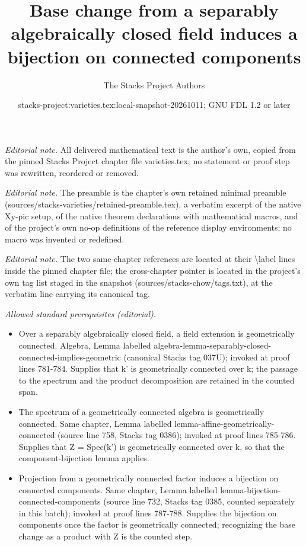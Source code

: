 \documentclass[10pt,a4paper]{amsart}
\title{Base change from a separably algebraically closed field induces a bijection on connected components}
\author{The Stacks Project Authors}
\date{stacks-project:varieties.tex:local-snapshot-20261011; GNU FDL 1.2 or later}
\theoremstyle{plain}
\theoremstyle{definition}
\theoremstyle{remark}
\numberwithin{equation}{subsection}
\begin{document}
\maketitle
\noindent\textit{Editorial note.} All delivered mathematical text is the author's own, copied from the pinned Stacks Project chapter file varieties.tex; no statement or proof step was rewritten, reordered or removed.\par\medskip
\noindent\textit{Editorial note.} The preamble is the chapter's own retained minimal preamble (sources/stacks-varieties/retained-preamble.tex), a verbatim excerpt of the native Xy-pic setup, of the native theorem declarations with mathematical macros, and of the project's own no-op definitions of the reference display environments; no macro was invented or redefined.\par\medskip
\noindent\textit{Editorial note.} The two same-chapter references are located at their \textbackslash{}label lines inside the pinned chapter file; the cross-chapter pointer is located in the project's own tag list staged in the snapshot (sources/stacks-chow/tags.txt), at the verbatim line carrying its canonical tag.\par\medskip
\noindent\textit{Allowed standard prerequisites (editorial).}\begin{itemize}
\item Over a separably algebraically closed field, a field extension is geometrically connected. Algebra, Lemma labelled algebra-lemma-separably-closed-connected-implies-geometric (canonical Stacks tag 037U); invoked at proof lines 781-784. Supplies that k' is geometrically connected over k; the passage to the spectrum and the product decomposition are retained in the counted span.
\item The spectrum of a geometrically connected algebra is geometrically connected. Same chapter, Lemma labelled lemma-affine-geometrically-connected (source line 758, Stacks tag 0386); invoked at proof lines 785-786. Supplies that Z = Spec(k') is geometrically connected over k, so that the component-bijection lemma applies.
\item Projection from a geometrically connected factor induces a bijection on connected components. Same chapter, Lemma labelled lemma-bijection-connected-components (source line 732, Stacks tag 0385, counted separately in this batch); invoked at proof lines 787-788. Supplies the bijection on components once the factor is geometrically connected; recognizing the base change as a product with Z is the counted step.
\end{itemize}\medskip
\end{document}
